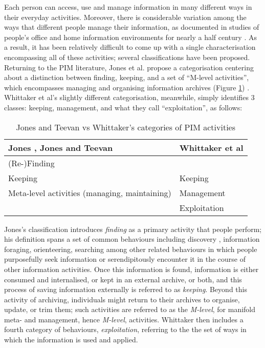 \documentclass[runningheads,a4paper]{llncs}
\begin{document}
Each person can access, use and manage information in many different ways in their everyday activities.  Moreover, there is considerable variation among the ways that different people manage their information, as documented in studies of people's office and home information environments for nearly a half century \cite{filerspilers}.  As a result, it has been relatively difficult to come up with a single characterisation encompassing all of these activities; several classifications have been proposed.  Returning to the PIM literature, Jones et al. propose a categorisation centering about a distinction between finding, keeping, and a set of ``M-level activities'', which encompasses managing and organising information archives (Figure \ref{fig:pimactivities}) \cite{kftf}. Whittaker et al's slightly different categorisation, meanwhile, simply identifies 3 classes: keeping, management, and what they call ``exploitation'', as follows:

\begin{table}
\begin{center}
\begin{tabular}{p{4.5cm} | p{4.5cm}} 
Jones \cite{jones}, Jones and Teevan \cite{jonesteevan}& Whittaker et al \cite{whittaker}\\
\hline
(Re-)Finding &  \\
Keeping & Keeping \\
Meta-level activities (managing, maintaining) & Management \\
 & Exploitation \\
\end{tabular}
\caption{Jones and Teevan vs Whittaker's categories of PIM activities}
\label{fig:pimactivities}
\end{center}
\end{table}

Jones's classification introduces \emph{finding} as a primary activity that people perform; his definition spans a set of common behaviours including discovery \cite{}, information foraging\cite{}, orienteering\cite{}, searching\cite{} among other related behaviours in which people purposefully seek information or serendipitously encounter it in the course of other information activities.  Once this information is found, information is either consumed and internalised, or kept in an external archive, or both, and this process of saving information externally is referred to as \emph{keeping}.  Beyond this activity of archiving, individuals might return to their archives to organise, update, or trim them; such activities are referred to as the \emph{M-level}, for manifold meta- and management, hence \emph{M-level}, activities.  Whittaker then includes a fourth category of behaviours, \emph{exploitation}, referring to the the set of ways in which the information is used and applied.
\end{document}
